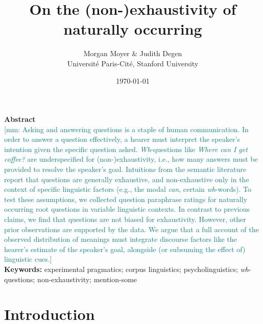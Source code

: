 \documentclass[12pt,letterpaper,table,svgnames,dvipsnames]{article}
\title{\textbf{On the (non-)exhaustivity of naturally occurring \whqs}}
\author{\Large{Morgan Moyer \& Judith Degen}\\
Universit\'{e} Paris-Cit\'{e}, Stanford University}
\date{\today}
\newcommand{\mm}[1]{\textcolor{teal}{[mm: #1]}}
\begin{document}
\maketitle

\small
\noindent \textbf{Abstract}\\
\noindent \mm{Asking and answering questions is a staple of human communication. In order to answer a question effectively, a hearer must interpret the speaker's intention given the specific question asked. \emph{Wh}-questions like \emph{Where can I get coffee?} are underspecified for (non-)exhaustivity, i.e., how many answers must be provided to resolve the speaker's goal. Intuitions from the semantic literature report that questions are generally exhaustive, and non-exhaustive only in the context of specific linguistic factors (e.g., the modal \emph{can}, certain \emph{wh}-words). To test these assumptions, we collected question paraphrase ratings for naturally occurring root questions in variable linguistic contexts. In contrast to previous claims, we find that questions are not biased for exhaustivity. However, other prior observations are supported by the data. We argue that a full account of the observed distribution of meanings must integrate discourse factors like the hearer's estimate of the speaker's goal, alongside (or subsuming the effect of) linguistic cues.}\\

\noindent \textbf{Keywords:} 
experimental pragmatics; corpus linguistics; psycholinguistics; \emph{wh}-questions; non-exhaustivity; mention-some
\normalsize

\section{Introduction}
\end{document}
